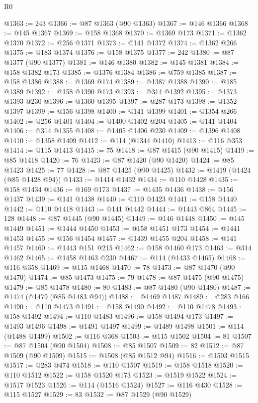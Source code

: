 \begin{lexlean}{R0}
\begin{coremodule}
@1363 := 243
@1366 := @87 @1363 (@90 @1363)
@1367 := @146 @1366
@1368 := @145 @1367
@1369 := @158 @1368
@1370 := @1369 @173
@1371 := @1362 @1370
@1372 := @256 @1371
@1373 := @141 @1372
@1374 := @1362 @266
@1375 := @183 @1374
@1376 := @158 @1375
@1377 := 242
@1380 := @87 @1377 (@90 @1377)
@1381 := @146 @1380
@1382 := @145 @1381
@1384 := @158 @1382 @173
@1385 := @1376 @1384
@1386 := @759 @1385
@1387 := @158 @1386
@1388 := @1369 @174
@1389 := @1387 @1388
@1390 := @185 @1389
@1392 := @158 @1390 @173
@1393 := @314 @1392
@1395 := @1373 @1393 @230
@1396 := @1360 @1395
@1397 := @287 @173
@1398 := @1352 @1397
@1399 := @156 @1398
@1400 := @141 @1399
@1401 := @1354 @266
@1402 := @256 @1401
@1404 := @1400 @1402 @204
@1405 := @141 @1404
@1406 := @314 @1355
@1408 := @1405 @1406 @230
@1409 := @1396 @1408
@1410 := @1358 @1409
@1412 := @114 (@1344 @1410)
@1413 := @116 @353
@1414 := @115 @1413
@1415 := 75
@1418 := @87 @1415 (@90 @1415)
@1419 := @85 @1418
@1420 := 76
@1423 := @87 @1420 (@90 @1420)
@1424 := @85 @1423
@1425 := 77
@1428 := @87 @1425 (@90 @1425)
@1432 := @1419 (@1424 (@85 @1428 @94))
@1433 := @1414 @1432
@1434 := @110 @1428
@1435 := @158 @1434
@1436 := @169 @173
@1437 := @1435 @1436
@1438 := @156 @1437
@1439 := @141 @1438
@1440 := @110 @1423
@1441 := @158 @1440
@1442 := @110 @1418
@1443 := @141 @1442
@1444 := @1443 @864
@1445 := 128
@1448 := @87 @1445 (@90 @1445)
@1449 := @146 @1448
@1450 := @145 @1449
@1451 := @1444 @1450
@1453 := @158 @1451 @173
@1454 := @1441 @1453
@1455 := @156 @1454
@1457 := @1439 @1455 @204
@1458 := @141 @1457
@1460 := @1443 @151 @215
@1462 := @158 @1460 @173
@1463 := @314 @1462
@1465 := @1458 @1463 @230
@1467 := @114 (@1433 @1465)
@1468 := @116 @358
@1469 := @115 @1468
@1470 := 78
@1473 := @87 @1470 (@90 @1470)
@1474 := @85 @1473
@1475 := 79
@1478 := @87 @1475 (@90 @1475)
@1479 := @85 @1478
@1480 := 80
@1483 := @87 @1480 (@90 @1480)
@1487 := @1474 (@1479 (@85 @1483 @94))
@1488 := @1469 @1487
@1489 := @283 @166
@1490 := @110 @1473
@1491 := @158 @1490
@1492 := @110 @1478
@1493 := @158 @1492
@1494 := @110 @1483
@1496 := @158 @1494 @173
@1497 := @1493 @1496
@1498 := @1491 @1497
@1499 := @1489 @1498
@1501 := @114 (@1488 @1499)
@1502 := @116 @368
@1503 := @115 @1502
@1504 := 81
@1507 := @87 @1504 (@90 @1504)
@1508 := @85 @1507
@1509 := 82
@1512 := @87 @1509 (@90 @1509)
@1515 := @1508 (@85 @1512 @94)
@1516 := @1503 @1515
@1517 := @283 @474
@1518 := @110 @1507
@1519 := @158 @1518
@1520 := @110 @1512
@1522 := @158 @1520 @173
@1523 := @1519 @1522
@1524 := @1517 @1523
@1526 := @114 (@1516 @1524)
@1527 := @116 @430
@1528 := @115 @1527
@1529 := 83
@1532 := @87 @1529 (@90 @1529)

\end{coremodule}
\end{lexlean}
